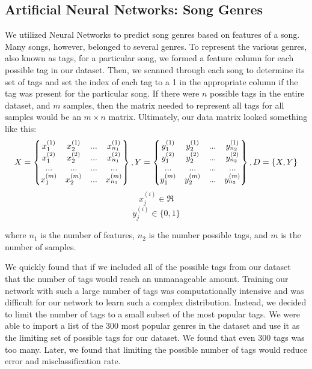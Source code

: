 \documentclass[12pt]{article}
\begin{document}
\subsection{Artificial Neural Networks: Song Genres}
\label{subsec:ann}
We utilized Neural Networks to predict song genres based on features of a song. Many songs, however, belonged to several genres. To represent the various genres, also known as tags, for a particular song, we formed a feature column for each possible tag in our dataset. Then, we scanned through each song to determine its set of tags and set the index of each tag to a 1 in the appropriate column if the tag was present for the particular song. If there were $n$ possible tags in the entire dataset, and $m$ samples, then the matrix needed to represent all tags for all samples would be an $m \times n$ matrix. Ultimately, our data matrix looked something like this:
\begin{equation}
    X = \begin{Bmatrix}
    	x^{(1)}_1 & x^{(1)}_2 & ... & x^{(1)}_{n_1} \\
    	x^{(2)}_1 & x^{(2)}_2 & ... & x^{(2)}_{n_1} \\
    	...       & ...       & ... & ... \\
        x^{(m)}_1 & x^{(m)}_2 & ... & x^{(m)}_{n_1} \\
    \end{Bmatrix},
    \\
    Y = \begin{Bmatrix}
    y^{(1)}_1 & y^{(1)}_2 & ... & y^{(1)}_{n_2} \\
    y^{(2)}_1 & y^{(2)}_2 & ... & y^{(2)}_{n_2} \\
    ...       & ...       & ... & ... \\
    y^{(m)}_1 & y^{(m)}_2 & ... & y^{(m)}_{n_2} \\
    \end{Bmatrix},
    \\
    D = \{X,Y\}
\end{equation} 
\begin{equation}
    x^{(i)}_j \in \Re
\end{equation}
\begin{equation}
    y^{(i)}_j \in \{0, 1\}
\end{equation}

where $n_1$ is the number of features, $n_2$ is the number possible tags, and $m$ is the number of samples.

We quickly found that if we included all of the possible tags from our dataset that the number of tags would reach an unmanageable amount. Training our network with such a large number of tags was computationally intensive and was difficult for our network to learn such a complex distribution. Instead, we decided to limit the number of tags to a small subset of the most popular tags. We were able to import a list of the 300 most popular genres in the dataset and use it as the limiting set of possible tags for our dataset. We found that even 300 tags was too many. Later, we found that limiting the possible number of tags would reduce error and misclassification rate.
\end{document}
